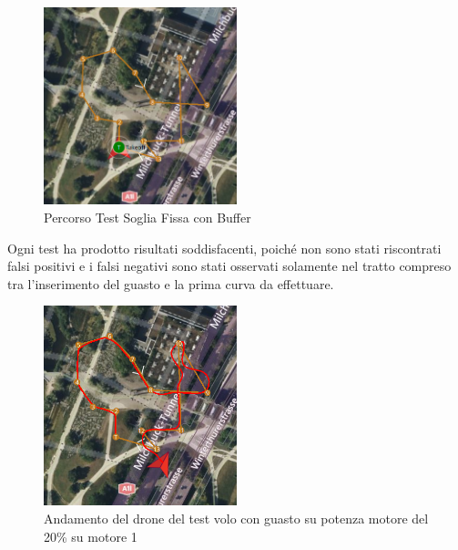 \begin{figure}[H]
    \centering
    \includegraphics[width=0.5\textwidth]{files/images/path_soglia_fissa1 (1).png}
    \caption{Percorso Test Soglia Fissa con Buffer}
    \label{fig:Percorso Test Soglia Fissa con Buffer}
\end{figure}
\noindent
Ogni test ha prodotto risultati soddisfacenti, poiché non sono stati riscontrati falsi positivi e i falsi negativi sono stati osservati solamente nel tratto compreso tra l'inserimento del guasto e la prima curva da effettuare.

\begin{figure}[H]
    \centering
    \includegraphics[width=0.5\textwidth]{files/images/path_soglia_fissa1 (2).png}
    \caption{Andamento del drone del test volo con guasto su potenza motore del 20\% su motore 1}
    \label{Risultato volo con guasto su potenza motore del 20\% su motore 1}
\end{figure}
\noindent

